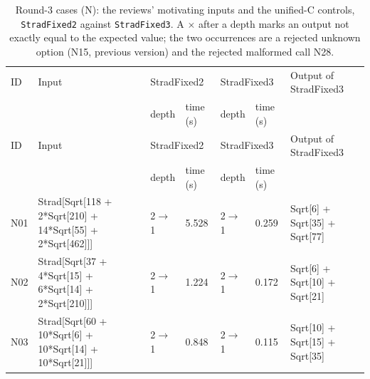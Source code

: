 \begin{longtable}{@{}p{}>{\ttfamily\footnotesize\raggedright\arraybackslash}p{}p{}p{}p{}p{}>{\ttfamily\footnotesize\raggedright\arraybackslash}p{}@{}}
\caption{Round-3 cases (N): the reviews' motivating inputs and the unified-C controls, \texttt{StradFixed2} against \texttt{StradFixed3}. A $\times$ after a depth marks an output not exactly equal to the expected value; the two occurrences are a rejected unknown option (N15, previous version) and the rejected malformed call N28.}\label{tab:cmpN}\\
\toprule ID & Input & \multicolumn{2}{l}{StradFixed2} & \multicolumn{2}{l}{StradFixed3} & Output of StradFixed3\\ & & depth & time (s) & depth & time (s) & \\\midrule\endfirsthead
\toprule ID & Input & \multicolumn{2}{l}{StradFixed2} & \multicolumn{2}{l}{StradFixed3} & Output of StradFixed3\\ & & depth & time (s) & depth & time (s) & \\\midrule\endhead
\bottomrule\endfoot
N01 & Strad[\allowbreak{}Sqrt[\allowbreak{}118 +\allowbreak{} 2*\allowbreak{}Sqrt[\allowbreak{}210]\allowbreak{} +\allowbreak{} 14*\allowbreak{}Sqrt[\allowbreak{}55]\allowbreak{} +\allowbreak{} 2*\allowbreak{}Sqrt[\allowbreak{}462]\allowbreak{}]\allowbreak{}]\allowbreak{} & 2$\to$1 & 5.528 & 2$\to$1 & 0.259 & Sqrt[\allowbreak{}6]\allowbreak{} +\allowbreak{} Sqrt[\allowbreak{}35]\allowbreak{} +\allowbreak{} Sqrt[\allowbreak{}77]\allowbreak{}\\
N02 & Strad[\allowbreak{}Sqrt[\allowbreak{}37 +\allowbreak{} 4*\allowbreak{}Sqrt[\allowbreak{}15]\allowbreak{} +\allowbreak{} 6*\allowbreak{}Sqrt[\allowbreak{}14]\allowbreak{} +\allowbreak{} 2*\allowbreak{}Sqrt[\allowbreak{}210]\allowbreak{}]\allowbreak{}]\allowbreak{} & 2$\to$1 & 1.224 & 2$\to$1 & 0.172 & Sqrt[\allowbreak{}6]\allowbreak{} +\allowbreak{} Sqrt[\allowbreak{}10]\allowbreak{} +\allowbreak{} Sqrt[\allowbreak{}21]\allowbreak{}\\
N03 & Strad[\allowbreak{}Sqrt[\allowbreak{}60 +\allowbreak{} 10*\allowbreak{}Sqrt[\allowbreak{}6]\allowbreak{} +\allowbreak{} 10*\allowbreak{}Sqrt[\allowbreak{}14]\allowbreak{} +\allowbreak{} 10*\allowbreak{}Sqrt[\allowbreak{}21]\allowbreak{}]\allowbreak{}]\allowbreak{} & 2$\to$1 & 0.848 & 2$\to$1 & 0.115 & Sqrt[\allowbreak{}10]\allowbreak{} +\allowbreak{} Sqrt[\allowbreak{}15]\allowbreak{} +\allowbreak{} Sqrt[\allowbreak{}35]\allowbreak{}\\

\end{longtable}
